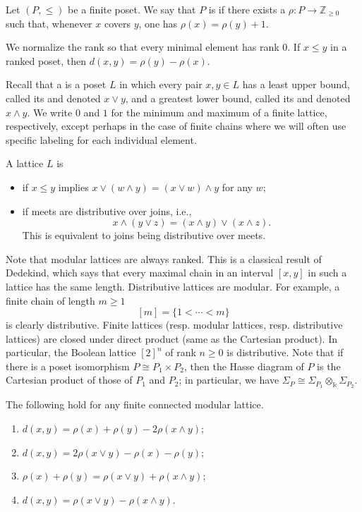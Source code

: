 \documentclass[a4paper,leqno]{amsart}
\begin{document}
\begin{dfn}
Let $(P,\leq)$ be a finite poset. We say that $P$ is  if
there exists a 
$\rho:P\to\mathbb Z_{\geq0}$ such that, whenever $x$ covers $y$, one has
$\rho(x)=\rho(y)+1$.
\end{dfn}
We normalize the rank so that every minimal element has rank $0$. If
$x\leq y$ in a ranked poset, then $d(x,y)=\rho(y)-\rho(x)$.

Recall that a  is a poset $L$ in which every pair
$x,y\in L$ has a least upper bound, called its  and denoted
$x\vee y$, and a greatest lower bound, called its  and denoted
$x\wedge y$. We write $0$ and $1$ for the minimum and maximum of a finite lattice, respectively, except perhaps in the case of finite chains where we will often use specific labeling for each individual element.

\begin{dfn}
A lattice $L$ is
\begin{itemize}
    \item {} if $x\leq y$ implies
    $x\vee(w\wedge y)=(x\vee w)\wedge y$ for any $w$;

    \item {} if meets are distributive over joins, i.e.,
    \[
    x\wedge(y\vee z)=(x\wedge y)\vee(x\wedge z).
    \]
    This is equivalent to joins being distributive over meets.
\end{itemize}
\end{dfn}
Note that modular lattices are always ranked. This is a classical result of Dedekind, which says that every maximal chain in an interval $[x,y]$ in such a lattice has the same length. Distributive lattices are modular. For example, a finite chain of length $m\ge 1$
\[
[m]=\{1<\cdots<m\}
\]
is clearly distributive.
Finite lattices (resp. modular lattices, resp. distributive lattices) are closed under direct product (same as the Cartesian product).  In particular, the Boolean lattice $[2]^n$ of rank $n\ge 0$ is distributive.
Note that if there is a poset isomorphism $P\cong P_1\times P_2$, then the Hasse diagram of $P$ is the Cartesian product of those of $P_1$ and $P_2$; in particular, we have $\Sigma_P \cong \Sigma_{P_1}\otimes_{\Bbbk} \Sigma_{P_2}$.

\begin{lem}\label{lem:modular-lattice-distance}
The following hold for any finite connected modular lattice.
\begin{enumerate}
    \item $d(x,y)=\rho(x)+\rho(y)-2\rho(x\wedge y)$;
    \item $d(x,y)=2\rho(x\vee y)-\rho(x)-\rho(y)$;
    \item $\rho(x)+\rho(y)=\rho(x\vee y)+\rho(x\wedge y)$;
    \item $d(x,y)=\rho(x\vee y)-\rho(x\wedge y)$.
\end{enumerate}
\end{lem}
\end{document}
